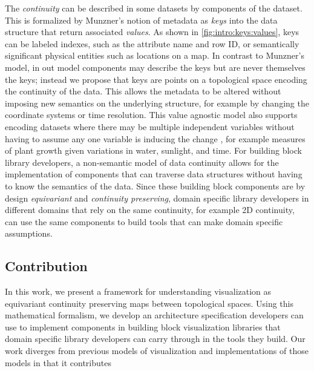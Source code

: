 \documentclass[../main.tex]{subfiles}
\begin{document}
The \textit{continuity} can be described in some datasets by components of the dataset. This is formalized by Munzner's notion of metadata as \textit{keys} into the data structure that return associated \textit{values}\cite{munznerChDataAbstraction}. As shown in \autoref{fig:intro:keys:values}, keys can be labeled indexes, such as the attribute name and row ID, or semantically significant physical entities such as locations on a map. In contrast to Munzner's model, in out model components may describe the keys but are never themselves the keys; instead we propose that keys are points on a topological space encoding the continuity of the data. This allows the metadata to be altered without imposing new semantics on the underlying structure, for example by changing the coordinate systems or time resolution. This value agnostic model also supports encoding datasets where there may be multiple independent variables without having to assume any one variable is inducing the change , for example measures of plant growth given variations in water, sunlight, and time. For building block library developers, a non-semantic model of data continuity allows for the implementation of components that can traverse data structures without having to know the semantics of the data. Since these building block components are by design \textit{equivariant} and \textit{continuity preserving}, domain specific library developers in different domains that rely on the same continuity, for example 2D continuity, can use the same components to build tools that can make domain specific assumptions.

\subsection{Contribution}
In this work, we present a framework for understanding visualization as equivariant continuity preserving maps between topological spaces. Using this mathematical formalism, we develop an architecture specification developers can use to implement components in building block visualization libraries that domain specific library developers can carry through in the tools they build. Our work diverges from previous models of visualization and implementations of those models in that it contributes
\end{document}
